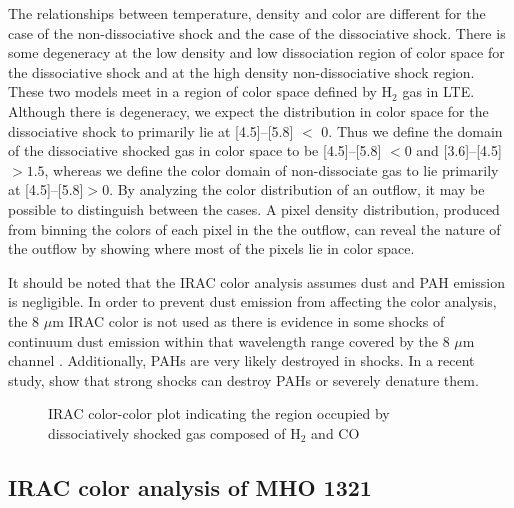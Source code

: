 \documentclass[iop]{emulateapj}
\begin{document}
The relationships between temperature, density and color are different
for the case of the non-dissociative shock and the case of the 
dissociative shock. 
There is some degeneracy at the low density and low dissociation region 
of color space for the dissociative shock and at the high density non-dissociative
shock region. These two models meet in a region of color space
defined by H$_2$ gas in LTE.
Although there is degeneracy, we expect the distribution in color
space for the dissociative shock to primarily lie at [4.5]--[5.8] $<$ 0.
Thus we define the domain of the dissociative shocked gas in 
color space to be [4.5]--[5.8] $< 0$ and [3.6]--[4.5] $> 1.5$,
whereas we define the color domain of non-dissociate gas to lie primarily 
at [4.5]--[5.8]$ > 0$. By analyzing the color distribution
of an outflow, it may be possible to distinguish between the 
cases. A pixel density distribution, produced from binning the 
colors of each pixel in the the outflow, can reveal the 
nature of the outflow by showing where most of the pixels 
lie in color space. 

It should be noted that the IRAC color analysis assumes dust and PAH emission is negligible. In order to prevent dust emission from affecting the color analysis, the 8 $\mu$m IRAC color is not used as there is evidence in some shocks of continuum dust emission within that wavelength range covered by the 8 $\mu$m channel \citep[eg.][]{smi2006}. Additionally, PAHs are very likely destroyed in shocks. In a recent study, \citet{mic2010} show that strong shocks can destroy PAHs or severely denature them. 

\begin{figure}
%
\caption{ IRAC color-color plot indicating the region occupied by 
dissociatively shocked gas composed of H$_2$ and CO 
} 
\end{figure}



\subsection{IRAC color analysis of MHO 1321}
\end{document}

